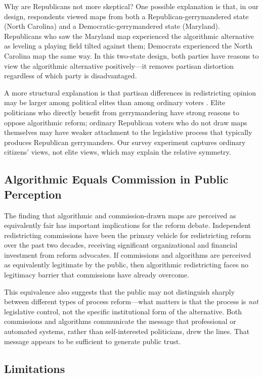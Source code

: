 Why are Republicans not more skeptical? One possible explanation is that, in our design, respondents viewed maps from both a Republican-gerrymandered state (North Carolina) and a Democratic-gerrymandered state (Maryland). Republicans who saw the Maryland map experienced the algorithmic alternative as leveling a playing field tilted against them; Democrats experienced the North Carolina map the same way. In this two-state design, both parties have reasons to view the algorithmic alternative positively---it removes partisan distortion regardless of which party is disadvantaged.

A more structural explanation is that partisan differences in redistricting opinion may be larger among political elites than among ordinary voters \citep{doherty2017}. Elite politicians who directly benefit from gerrymandering have strong reasons to oppose algorithmic reform; ordinary Republican voters who do not draw maps themselves may have weaker attachment to the legislative process that typically produces Republican gerrymanders. Our survey experiment captures ordinary citizens' views, not elite views, which may explain the relative symmetry.

\subsection{Algorithmic Equals Commission in Public Perception}

The finding that algorithmic and commission-drawn maps are perceived as equivalently fair has important implications for the reform debate. Independent redistricting commissions have been the primary vehicle for redistricting reform over the past two decades, receiving significant organizational and financial investment from reform advocates. If commissions and algorithms are perceived as equivalently legitimate by the public, then algorithmic redistricting faces no legitimacy barrier that commissions have already overcome.

This equivalence also suggests that the public may not distinguish sharply between different types of process reform---what matters is that the process is \textit{not} legislative control, not the specific institutional form of the alternative. Both commissions and algorithms communicate the message that professional or automated systems, rather than self-interested politicians, drew the lines. That message appears to be sufficient to generate public trust.

\subsection{Limitations}

